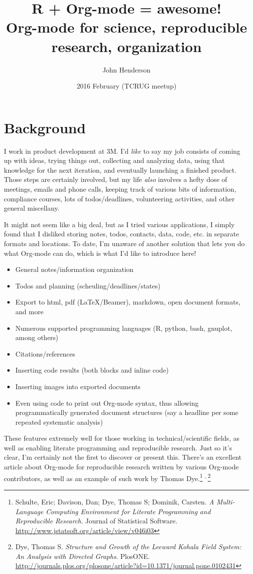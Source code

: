 \documentclass[11pt]{article}
\author{John Henderson}
\date{2016 February (TCRUG meetup)}
\title{R + Org-mode = awesome!\\\medskip
\large Org-mode for science, reproducible research, organization}
\begin{document}
\maketitle


\section*{Background}
\label{sec:orgheadline1}

I work in product development at 3M. I'd \emph{like} to say my job consists
of coming up with ideas, trying things out, collecting and analyzing
data, using that knowledge for the next iteration, and eventually launching a finished
product. Those steps are certainly involved, but my life \emph{also} involves a hefty dose of
meetings, emails and phone calls, keeping track of various bits of information, compliance
courses, lots of todos/deadlines, volunteering activities, and other general miscellany.

It might not seem like a big deal, but as I tried various applications, I simply found
that I disliked storing notes, todos, contacts, data, code, etc. in separate formats and
locations. To date, I'm unaware of another solution that lets you do what Org-mode can do, which is
what I'd like to introduce here!
\begin{itemize}
\item General notes/information organization
\item Todos and planning (scheuling/deadlines/states)
\item Export to html, pdf (\LaTeX{}/Beamer), markdown, open document formats, and more
\item Numerous supported programming languages (R, python, bash, gnuplot, among others)
\item Citations/references
\item Inserting code results (both blocks and inline code)
\item Inserting images into exported documents
\item Even using code to print out Org-mode syntax, thus allowing programmatically generated
document structures (say a headline per some repeated systematic analysis)
\end{itemize}

These features extremely well for those working in technical/scientific fields, as well as
enabling literate programming and reproducible research. Just so it's clear, I'm certainly
not the first to discover or present this. There's an excellent article about Org-mode for
reproducible research written by various Org-mode contributors, as well as an
example of such work by Thomas Dye.\footnote{Schulte, Eric; Davison, Dan; Dye, Thomas S; Dominik, Carsten. \emph{A Multi-Language Computing Environment for Literate Programming and Reproducible Research}. 
Journal of Statistical Software. \url{http://www.jstatsoft.org/article/view/v046i03}} \textsuperscript{,}\,\footnote{Dye, Thomas S. \emph{Structure and Growth of the Leeward Kohala Field System: An
Analysis with Directed Graphs}. PlosONE. \url{http://journals.plos.org/plosone/article?id=10.1371/journal.pone.0102431}}
\end{document}
